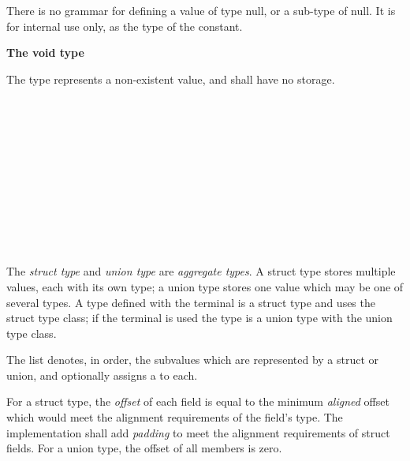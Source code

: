 \specsubsubitem
There is no grammar for defining a value of type null, or a sub-type of null. It
is for internal use only, as the type of the  constant.

\textbf{The void type}

\specsubsubitem
The  type represents a non-existent value, and shall have no
storage.


\begin{grammar}
 \\
	 \terminal{\{}  \terminal{\}} \\
	 \terminal{\{}  \terminal{\}} \\

 \\
	 \optional{\terminal{,}} \\
	 \terminal{,}  \\

 \\
	 \terminal{:}  \\
	 \\
	 \\
\end{grammar}

\specsubsubitem
The \textit{struct type} and \textit{union type} are \textit{aggregate types}.
A struct type stores multiple values, each with its own type; a union type
stores one value which may be one of several types. A type defined with the
 terminal is a struct type and uses the struct type class; if
the  terminal is used the type is a union type with the union
type class.

\specsubsubitem
The  list denotes, in order, the subvalues which are
represented by a struct or union, and optionally assigns a  to
each.

\specsubsubitem
For a struct type, the \textit{offset} of each field is equal to the minimum
\textit{aligned} offset which would meet the alignment requirements of the
field's type. The implementation shall add \textit{padding} to meet the
alignment requirements of struct fields. For a union type, the offset of all
members is zero.

